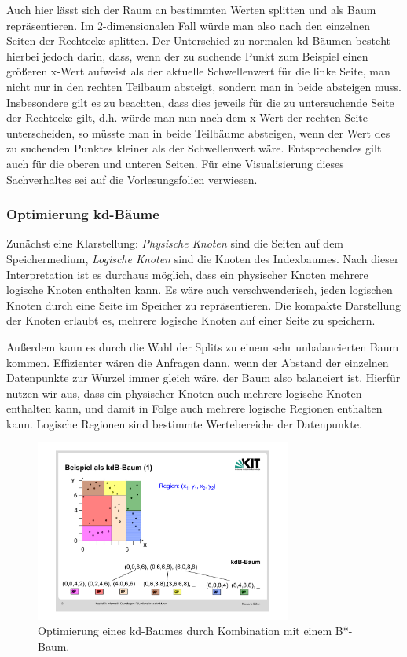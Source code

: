 Auch hier lässt sich der Raum an bestimmten Werten splitten und als Baum
repräsentieren. Im 2-dimensionalen Fall würde man also nach den einzelnen
Seiten der Rechtecke splitten. Der Unterschied zu normalen kd-Bäumen besteht
hierbei jedoch darin, dass, wenn der zu suchende Punkt zum Beispiel einen größeren
x-Wert aufweist als der aktuelle Schwellenwert
für die linke Seite, man nicht nur in den rechten
Teilbaum absteigt, sondern man in beide absteigen muss. Insbesondere gilt es zu
beachten, dass dies jeweils für die zu untersuchende Seite der Rechtecke gilt,
d.h. würde man nun nach dem x-Wert der rechten Seite unterscheiden, so müsste man
in beide Teilbäume absteigen, wenn der Wert des zu suchenden Punktes kleiner als
der Schwellenwert wäre. Entsprechendes gilt auch für die oberen und unteren
Seiten. Für eine Visualisierung dieses Sachverhaltes sei auf die Vorlesungsfolien
verwiesen.

\subsubsection{Optimierung kd-Bäume}
Zunächst eine Klarstellung: \textit{Physische Knoten} sind die Seiten auf dem
Speichermedium, \textit{Logische Knoten} sind die Knoten des Indexbaumes. Nach dieser
Interpretation ist es durchaus möglich, dass ein physischer Knoten mehrere logische
Knoten enthalten kann. Es wäre auch verschwenderisch, jeden logischen Knoten durch
eine Seite im Speicher zu repräsentieren. 
Die kompakte Darstellung der Knoten erlaubt es, mehrere logische Knoten auf einer
Seite zu speichern. 

Außerdem kann es durch die Wahl der Splits
zu einem sehr unbalancierten Baum kommen. Effizienter wären die Anfragen dann,
wenn der Abstand der einzelnen Datenpunkte zur Wurzel immer gleich wäre, der 
Baum also balanciert ist. Hierfür nutzen wir aus, dass ein physischer Knoten
auch mehrere logische Knoten enthalten kann, und damit in Folge auch mehrere 
logische Regionen enthalten kann. Logische Regionen sind bestimmte Wertebereiche
der Datenpunkte.


\begin{figure}[htbp]
	\centering
	\includegraphics[width=0.75\textwidth]{Figures/kdB_Tree}
	\caption[kdB-Baum]{Optimierung eines kd-Baumes durch Kombination mit einem B*-Baum.\footnotemark}
	\label{fig:kdB_Tree}
\end{figure}

